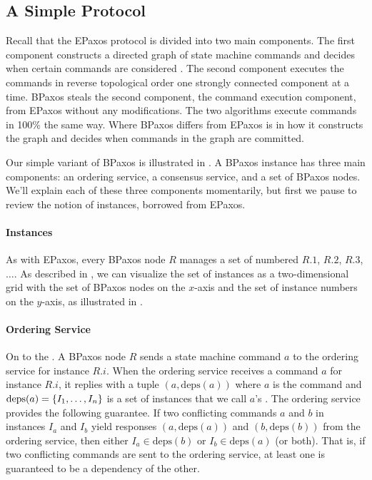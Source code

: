 \documentclass{mwhittaker}
\begin{document}
\subsection{A Simple Protocol}
Recall that the EPaxos protocol is divided into two main components. The first
component constructs a directed graph of state machine commands and decides
when certain commands are considered . The second component
executes the commands in reverse topological order one strongly connected
component at a time. BPaxos steals the second component, the command execution
component, from EPaxos without any modifications. The two algorithms execute
commands in 100\% the same way. Where BPaxos differs from EPaxos is in how it
constructs the graph and decides when commands in the graph are committed.

Our simple variant of BPaxos is illustrated in . A BPaxos
instance has three main components: an ordering service, a consensus service,
and a set of BPaxos nodes. We'll explain each of these three components
momentarily, but first we pause to review the notion of instances, borrowed
from EPaxos.

{}

\paragraph{Instances}
As with EPaxos, every BPaxos node $R$ manages a set of numbered
 $R.1$, $R.2$, $R.3$, $\ldots$. As described in
\cite{moraru2013there}, we can visualize the set of instances as a
two-dimensional grid with the set of BPaxos nodes on the $x$-axis and the set
of instance numbers on the $y$-axis, as illustrated in
.

{}

\paragraph{Ordering Service}
\newcommand{\deps}[1]{\text{deps}(#1)}

On to the . A BPaxos node $R$ sends a state machine
command $a$ to the ordering service for instance $R.i$. When the ordering
service receives a command $a$ for instance $R.i$, it replies with a tuple $(a,
\deps{a})$ where $a$ is the command and $\deps{a} = \set{I_1, \ldots, I_n}$ is
a set of instances that we call $a$'s . The ordering
service provides the following guarantee. If two conflicting commands $a$ and
$b$ in instances $I_a$ and $I_b$ yield responses $(a, \deps{a})$ and $(b,
\deps{b})$ from the ordering service, then either $I_a \in \deps{b}$ or $I_b
\in \deps{a}$ (or both). That is, if two conflicting commands are sent to the
ordering service, at least one is guaranteed to be a dependency of the other.
\end{document}
